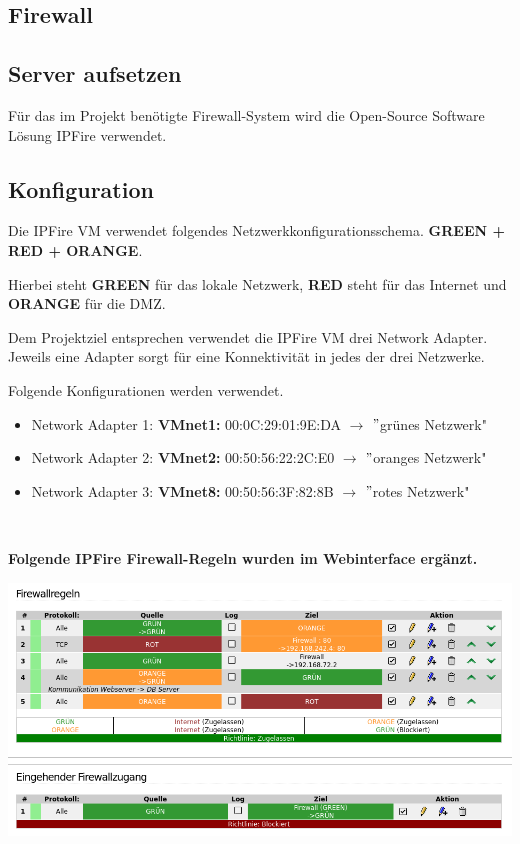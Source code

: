 \documentclass{scrartcl}
\begin{document}
\begin{flushleft}
    \section{Firewall}
    \subsection{Server aufsetzen}
    Für das im Projekt benötigte Firewall-System wird die Open-Source Software Lösung IPFire verwendet. 

    \subsection{Konfiguration}
    Die IPFire VM verwendet folgendes Netzwerkkonfigurationsschema. \newline
    \textbf{GREEN + RED + ORANGE}. \newline

    Hierbei steht \textbf{GREEN} für das lokale Netzwerk, \textbf{RED} steht für das Internet und \textbf{ORANGE} für die DMZ. \newline \newline

    Dem Projektziel entsprechen verwendet die IPFire VM drei Network Adapter.
    Jeweils eine Adapter sorgt für eine Konnektivität in jedes der drei Netzwerke. \newline
    
    Folgende Konfigurationen werden verwendet.
    \begin{itemize}
        \item Network Adapter 1:
        \subitem \textbf{VMnet1:} 00:0C:29:01:9E:DA $\rightarrow$ $"$grünes Netzwerk"
        \item Network Adapter 2:
        \subitem \textbf{VMnet2:} 00:50:56:22:2C:E0 $\rightarrow$ $"$oranges Netzwerk"
        \item Network Adapter 3:
        \subitem \textbf{VMnet8:} 00:50:56:3F:82:8B $\rightarrow$ $"$rotes Netzwerk"
    \end{itemize}
    \ \newline

    \textbf{Folgende IPFire Firewall-Regeln wurden im Webinterface ergänzt.}
    
    \includegraphics[width=\linewidth]{img/ipfire/6.png}
           

\end{flushleft}
\end{document}
